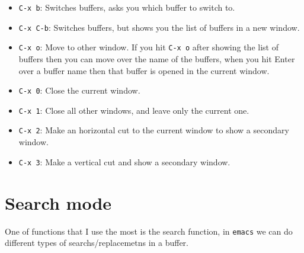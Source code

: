 \documentclass[12pt,a4paper,final]{article} %
\begin{document}
\begin{itemize}
\item \texttt{C-x b}: Switches buffers, asks you which buffer to
  switch to.
\item \texttt{C-x C-b}: Switches buffers, but shows you the list of
  buffers in a new window.
\item \texttt{C-x o}: Move to other window. If you hit \texttt{C-x o}
  after showing the list of buffers then you can move over the name of
  the buffers, when you hit Enter over a buffer name then that buffer
  is opened in the current window.
\item \texttt{C-x 0}: Close the current window.
\item \texttt{C-x 1}: Close all other windows, and leave only the
  current one.
\item \texttt{C-x 2}: Make an horizontal cut to the current window to
  show a secondary window. 
\item \texttt{C-x 3}: Make a vertical cut and show a secondary
  window.
\end{itemize}

\section{Search mode}
One of functions that I use the most is the search function, in
\texttt{emacs} we can do different types of searchs/replacemetns in a
buffer.
\end{document}
